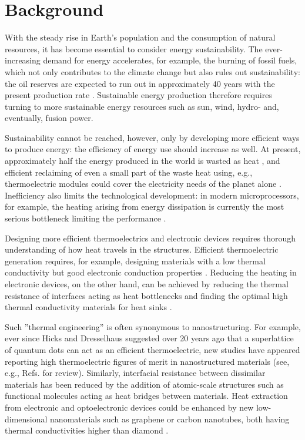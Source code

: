 
\section{Background}

With the steady rise in Earth's population and the consumption of natural resources, it has become essential to consider energy sustainability. The ever-increasing demand for energy accelerates, for example, the burning of fossil fuels, which not only contributes to the climate change but also rules out sustainability: the oil reserves are expected to run out in approximately 40 years with the present production rate \cite{}. Sustainable energy production therefore requires turning to more sustainable energy resources such as sun, wind, hydro- and, eventually, fusion power.

Sustainability cannot be reached, however, only by developing more efficient ways to produce energy: the efficiency of energy use should increase as well. At present, approximately half the energy produced in the world is wasted as heat \cite{}, and efficient reclaiming of even a small part of the waste heat using, e.g., thermoelectric modules could cover the electricity needs of the planet alone \cite{}. Inefficiency also limits the technological development: in modern microprocessors, for example, the heating arising from energy dissipation is currently the most serious bottleneck limiting the performance \cite{}. 

Designing more efficient thermoelectrics and electronic devices requires thorough understanding of how heat travels in the structures. Efficient thermoelectric generation requires, for example, designing materials with a low thermal conductivity but good electronic conduction properties \cite{chen}. Reducing the heating in electronic devices, on the other hand, can be achieved by reducing the thermal resistance of interfaces acting as heat bottlenecks and finding the optimal high thermal conductivity materials for heat sinks \cite{pop10}. 

Such ''thermal engineering'' is often synonymous to nanostructuring. For example, ever since Hicks and Dresselhaus \cite{hicks93} suggested over 20 years ago that a superlattice of quantum dots can act as an efficient thermoelectric, new studies have appeared reporting high thermoelectric figures of merit in nanostructured materials (see, e.g., Refs. \cite{vineis10,kanatzidis10,shakouri11} for review). Similarly, interfacial resistance between dissimilar materials has been reduced by the addition of atomic-scale structures such as functional molecules \cite{hopkins11,kaur14} acting as heat bridges between materials. Heat extraction from electronic and optoelectronic devices could be enhanced \cite{ghosh08,yan12} by new low-dimensional nanomaterials such as graphene or carbon nanotubes, both having thermal conductivities higher than diamond \cite{balandin11}. 

